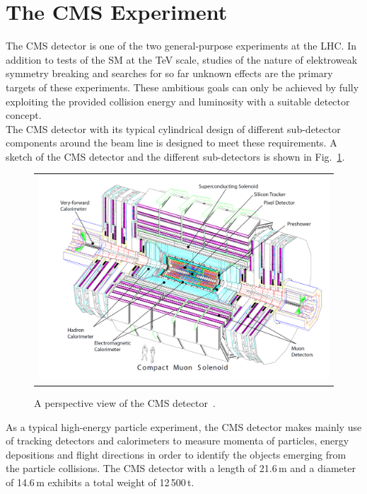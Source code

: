 \section{The CMS Experiment}
\label{sec:cms}
The CMS detector is one of the two general-purpose experiments at the LHC. In addition to tests of the SM at the TeV scale, studies of the nature of elektroweak symmetry breaking and searches for so far unknown effects are the primary targets of these experiments. These ambitious goals can only be achieved by fully exploiting the provided collision energy and luminosity with a suitable detector concept.\\
The CMS detector with its typical cylindrical design of different sub-detector components around the beam line is designed to meet these requirements. A sketch of the CMS detector and the different sub-detectors is shown in Fig.~\ref{fig:CMS}.
\begin{figure}[!tp]
  \centering
  \begin{tabular}{c}
    \includegraphics[width=1.0\textwidth]{figures/Figures_Experimental_Apparatus_CMS_perspective.png}
  \end{tabular}
  \caption{A perspective view of the CMS detector~\cite{Chatrchyan:2008zzk}.}
  \label{fig:CMS}
\end{figure}
As a typical high-energy particle experiment, the CMS detector makes mainly use of tracking detectors and calorimeters to measure momenta of particles, energy depositions and flight directions in order to identify the objects emerging from the particle collisions. The CMS detector with a length of 21.6\,m and a diameter of 14.6\,m exhibits a total weight of 12\,500\,t. \\  
